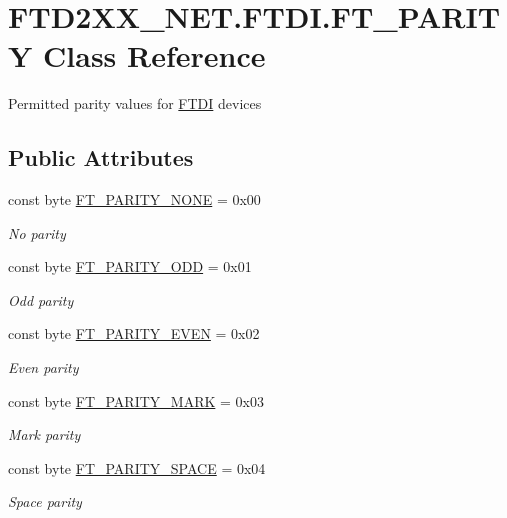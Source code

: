 \hypertarget{class_f_t_d2_x_x___n_e_t_1_1_f_t_d_i_1_1_f_t___p_a_r_i_t_y}{}\section{F\+T\+D2\+X\+X\+\_\+\+N\+E\+T.\+F\+T\+D\+I.\+F\+T\+\_\+\+P\+A\+R\+I\+TY Class Reference}
\label{class_f_t_d2_x_x___n_e_t_1_1_f_t_d_i_1_1_f_t___p_a_r_i_t_y}


Permitted parity values for \mbox{\hyperlink{class_f_t_d2_x_x___n_e_t_1_1_f_t_d_i}{F\+T\+DI}} devices  


\subsection*{Public Attributes}
\begin{DoxyCompactItemize}
\item 
const byte \mbox{\hyperlink{class_f_t_d2_x_x___n_e_t_1_1_f_t_d_i_1_1_f_t___p_a_r_i_t_y_acbd604e03322a2ff027a49965a043f19}{F\+T\+\_\+\+P\+A\+R\+I\+T\+Y\+\_\+\+N\+O\+NE}} = 0x00
\begin{DoxyCompactList}\small\item\em No parity \end{DoxyCompactList}\item 
const byte \mbox{\hyperlink{class_f_t_d2_x_x___n_e_t_1_1_f_t_d_i_1_1_f_t___p_a_r_i_t_y_a7b0aa388683cbb431524ebe771d8f969}{F\+T\+\_\+\+P\+A\+R\+I\+T\+Y\+\_\+\+O\+DD}} = 0x01
\begin{DoxyCompactList}\small\item\em Odd parity \end{DoxyCompactList}\item 
const byte \mbox{\hyperlink{class_f_t_d2_x_x___n_e_t_1_1_f_t_d_i_1_1_f_t___p_a_r_i_t_y_a5a57332679c7777aeb35f3e1beb641ad}{F\+T\+\_\+\+P\+A\+R\+I\+T\+Y\+\_\+\+E\+V\+EN}} = 0x02
\begin{DoxyCompactList}\small\item\em Even parity \end{DoxyCompactList}\item 
const byte \mbox{\hyperlink{class_f_t_d2_x_x___n_e_t_1_1_f_t_d_i_1_1_f_t___p_a_r_i_t_y_a70f5fa700ff2c1cf28c5ca46e71e7762}{F\+T\+\_\+\+P\+A\+R\+I\+T\+Y\+\_\+\+M\+A\+RK}} = 0x03
\begin{DoxyCompactList}\small\item\em Mark parity \end{DoxyCompactList}\item 
const byte \mbox{\hyperlink{class_f_t_d2_x_x___n_e_t_1_1_f_t_d_i_1_1_f_t___p_a_r_i_t_y_a954f5c6e8464515af87192e688c330bb}{F\+T\+\_\+\+P\+A\+R\+I\+T\+Y\+\_\+\+S\+P\+A\+CE}} = 0x04
\begin{DoxyCompactList}\small\item\em Space parity \end{DoxyCompactList}\end{DoxyCompactItemize}


